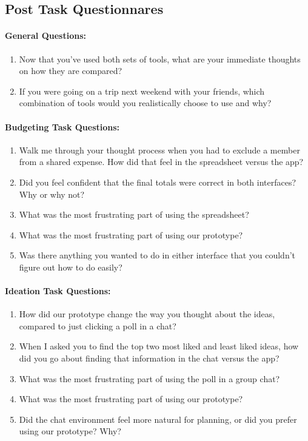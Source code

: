 \documentclass[12pt,a4paper]{article}
\begin{document}
\subsection{Post Task Questionnares}
\paragraph{General Questions: }
\begin{enumerate}
    \item Now that you’ve used both sets of tools, what are your immediate thoughts on how they are compared? 
    \item If you were going on a trip next weekend with your friends, which combination of tools would you realistically choose to use and why? 
    
\end{enumerate}

\paragraph{Budgeting Task Questions: }
\begin{enumerate}
    \item Walk me through your thought process when you had to exclude a member from a shared expense. How did that feel in the spreadsheet versus the app? 
    \item Did you feel confident that the final totals were correct in both interfaces? Why or why not? 
    \item What was the most frustrating part of using the spreadsheet?
    \item What was the most frustrating part of using our prototype? 
    \item Was there anything you wanted to do in either interface that you couldn’t figure out how to do easily? 
\end{enumerate}

\paragraph{Ideation Task Questions: }
\begin{enumerate}
    \item How did our prototype change the way you thought about the ideas, compared to just clicking a poll in a chat? 
    \item When I asked you to find the top two most liked and least liked ideas, how did you go about finding that information in the chat versus the app?
    \item What was the most frustrating part of using the poll in a group chat?
    \item What was the most frustrating part of using our prototype?
    \item Did the chat environment feel more natural for planning, or did you prefer using our prototype? Why?
\end{enumerate}
\end{document}
